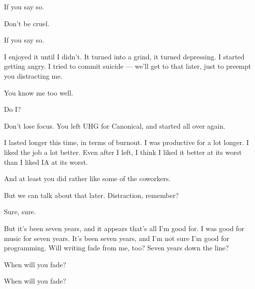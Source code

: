 \begin{ally}
If you say so.
\end{ally}
Don't be cruel.

\begin{ally}
If you say so.
\end{ally}
\newpage

I enjoyed it until I didn't. It turned into a grind, it turned depressing. I started getting angry. I tried to commit suicide --- we'll get to that later, just to preempt you distracting me.

\begin{ally}
You know me too well.
\end{ally}
Do I?

\begin{ally}
Don't lose focus. You left UHG for Canonical, and started all over again.
\end{ally}
I lasted longer this time, in terms of burnout. I was productive for a lot longer. I liked the job a lot better. Even after I left, I think I liked it better at its worst than I liked IA at its worst.

\begin{ally}
And at least you did rather like some of the coworkers.
\end{ally}
But we can talk about that later. Distraction, remember?

\begin{ally}
Sure, sure.
\end{ally}
But it's been seven years, and it appears that's all I'm good for. I was good for music for seven years. It's been seven years, and I'm not sure I'm good for programming. Will writing fade from me, too? Seven years down the line?

When will you fade?

\begin{ally}
When will you fade?
\end{ally}
\newpage
